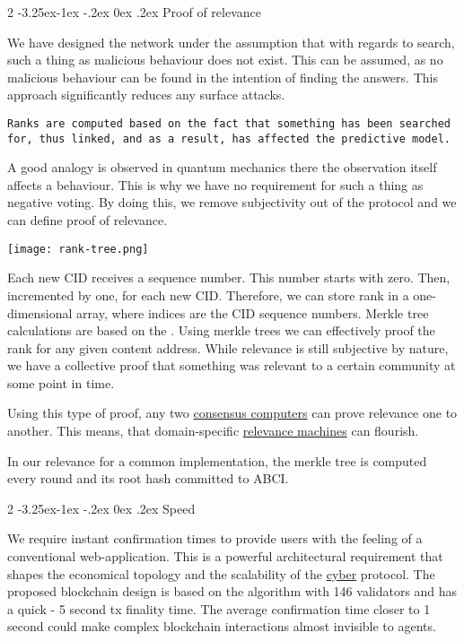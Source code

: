 \documentclass[8pt,oneside]{amsart}
\makeatletter
\newcommand{\linkred}[2]{\href{#1}{\color{red}{#2}}}
\newcommand{\linkgreen}[2]{\href{#1}{\color{green}{#2}}}
\renewcommand\subsection{\@startsection{subsection}
                                    {2}{\z@}
                                    {-3.25ex\@plus -1ex \@minus -.2ex}
                                    {0ex \@plus .2ex}
                                    {\play\Large}
                        }
\newcommand{\titleSection}[1]{\subsection{#1}}
\newenvironment{Figure}
  {\par\medskip\noindent\minipage{\linewidth}}
  {\endminipage\par\medskip}
\makeatother
\begin{document}
\titleSection{Proof of relevance}\label{proof-of-relevance}

We have designed the network under the assumption that with regards to search, such a thing as malicious behaviour does not exist. This can be assumed, as no malicious behaviour can be found in the intention of finding the answers. This approach significantly reduces any surface attacks.

\begin{lstlisting}
Ranks are computed based on the fact that something has been searched for, thus linked, and as a result, has affected the predictive model.
\end{lstlisting}

A good analogy is observed in quantum mechanics there the observation itself affects a behaviour. This is why we have no requirement for such a thing as negative voting. By doing this, we remove subjectivity out of the protocol and we can define proof of relevance.

\begin{Figure}
    \centering
    \texttt{[image: rank-tree.png]}
\end{Figure}

Each new CID receives a sequence number. This number starts with zero. Then, incremented by one, for each new CID. Therefore, we can store rank in a one-dimensional array, where indices are the CID sequence numbers. Merkle tree calculations are based on the \linkgreen{https://ipfs.io/ipfs/QmUUTW5gpJx7g5QF3PRkhjkk7jqs3r8EWcuVpZ9dHfx7DE}{RFC-6962 standard}. Using merkle trees we can effectively proof the rank for any given content address. While relevance is still subjective by nature, we have a collective proof that something was relevant to a certain community at some point in time.

Using this type of proof, any two \linkgreen{https://ipfs.io/ipfs/QmdCeixQUHBjGnKfwbB1dxf4X8xnadL8xWmmEnQah5n7x2}{IBC compatible} {\hyperref[consensus-computer]{consensus computers}} can prove relevance one to another. This means, that domain-specific {\hyperref[relevance-machine]{relevance machines}} can flourish.

In our relevance for a common \linkred{https://github.ccom/cybercongress/go-cyber}{go-cyber} implementation, the merkle tree is computed every round and its root hash committed to ABCI.

\titleSection{Speed}\label{speed}

We require instant confirmation times to provide users with the feeling of a conventional web-application. This is a powerful architectural requirement that shapes the economical topology and the scalability of the {\hyperref[cyber]{cyber}} protocol. The proposed blockchain design is based on the \linkgreen{https://ipfs.io/ipfs/QmaMtD7xDgghqgjN62zWZ5TBGFiEjGQtuZBjJ9sMh816KJ}{Tendermint consensus} algorithm with 146 validators and has a quick - 5 second tx finality time. The average confirmation time closer to 1 second could make complex blockchain interactions almost invisible to agents.
\end{document}
